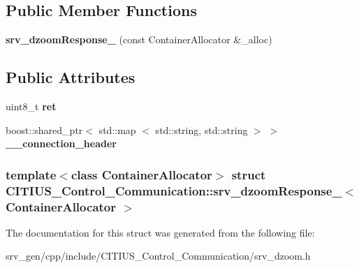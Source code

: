 \subsection*{\-Public \-Member \-Functions}
\begin{DoxyCompactItemize}
\item 
\hypertarget{struct_c_i_t_i_u_s___control___communication_1_1srv__dzoom_response___ad58a91a24beee7683457982b506bc4de}{{\bfseries srv\-\_\-dzoom\-Response\-\_\-} (const \-Container\-Allocator \&\-\_\-alloc)}\label{struct_c_i_t_i_u_s___control___communication_1_1srv__dzoom_response___ad58a91a24beee7683457982b506bc4de}

\end{DoxyCompactItemize}
\subsection*{\-Public \-Attributes}
\begin{DoxyCompactItemize}
\item 
\hypertarget{struct_c_i_t_i_u_s___control___communication_1_1srv__dzoom_response___a4b540526fc9345df97466274c2d656a6}{uint8\-\_\-t {\bfseries ret}}\label{struct_c_i_t_i_u_s___control___communication_1_1srv__dzoom_response___a4b540526fc9345df97466274c2d656a6}

\item 
\hypertarget{struct_c_i_t_i_u_s___control___communication_1_1srv__dzoom_response___ae314a2d64b7687c3768cd1ab3b947dba}{boost\-::shared\-\_\-ptr$<$ std\-::map\*
$<$ std\-::string, std\-::string $>$ $>$ {\bfseries \-\_\-\-\_\-connection\-\_\-header}}\label{struct_c_i_t_i_u_s___control___communication_1_1srv__dzoom_response___ae314a2d64b7687c3768cd1ab3b947dba}

\end{DoxyCompactItemize}
\subsubsection*{template$<$class Container\-Allocator$>$ struct C\-I\-T\-I\-U\-S\-\_\-\-Control\-\_\-\-Communication\-::srv\-\_\-dzoom\-Response\-\_\-$<$ Container\-Allocator $>$}



\-The documentation for this struct was generated from the following file\-:\begin{DoxyCompactItemize}
\item 
srv\-\_\-gen/cpp/include/\-C\-I\-T\-I\-U\-S\-\_\-\-Control\-\_\-\-Communication/srv\-\_\-dzoom.\-h\end{DoxyCompactItemize}
